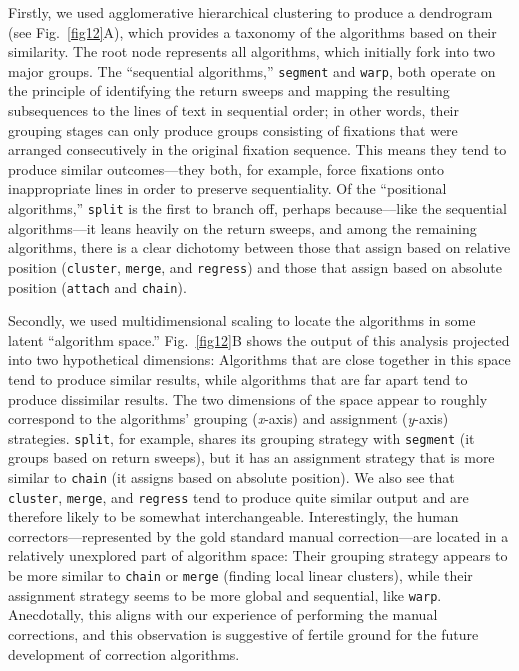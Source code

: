 \documentclass[doc,biblatex]{apa7}
\begin{document}
Firstly, we used agglomerative hierarchical clustering to produce a dendrogram (see Fig.~\ref{fig12}A), which provides a taxonomy of the algorithms based on their similarity. The root node represents all algorithms, which initially fork into two major groups. The ``sequential algorithms,'' \texttt{segment} and \texttt{warp}, both operate on the principle of identifying the return sweeps and mapping the resulting subsequences to the lines of text in sequential order; in other words, their grouping stages can only produce groups consisting of fixations that were arranged consecutively in the original fixation sequence. This means they tend to produce similar outcomes---they both, for example, force fixations onto inappropriate lines in order to preserve sequentiality. Of the ``positional algorithms,'' \texttt{split} is the first to branch off, perhaps because---like the sequential algorithms---it leans heavily on the return sweeps, and among the remaining algorithms, there is a clear dichotomy between those that assign based on relative position (\texttt{cluster}, \texttt{merge}, and \texttt{regress}) and those that assign based on absolute position (\texttt{attach} and \texttt{chain}).

Secondly, we used multidimensional scaling to locate the algorithms in some latent ``algorithm space.'' Fig.~\ref{fig12}B shows the output of this analysis projected into two hypothetical dimensions: Algorithms that are close together in this space tend to produce similar results, while algorithms that are far apart tend to produce dissimilar results. The two dimensions of the space appear to roughly correspond to the algorithms' grouping (\textit{x}-axis) and assignment (\textit{y}-axis) strategies. \texttt{split}, for example, shares its grouping strategy with \texttt{segment} (it groups based on return sweeps), but it has an assignment strategy that is more similar to \texttt{chain} (it assigns based on absolute position). We also see that \texttt{cluster}, \texttt{merge}, and \texttt{regress} tend to produce quite similar output and are therefore likely to be somewhat interchangeable. Interestingly, the human correctors---represented by the gold standard manual correction---are located in a relatively unexplored part of algorithm space: Their grouping strategy appears to be more similar to \texttt{chain} or \texttt{merge} (finding local linear clusters), while their assignment strategy seems to be more global and sequential, like \texttt{warp}. Anecdotally, this aligns with our experience of performing the manual corrections, and this observation is suggestive of fertile ground for the future development of correction algorithms.
\end{document}
